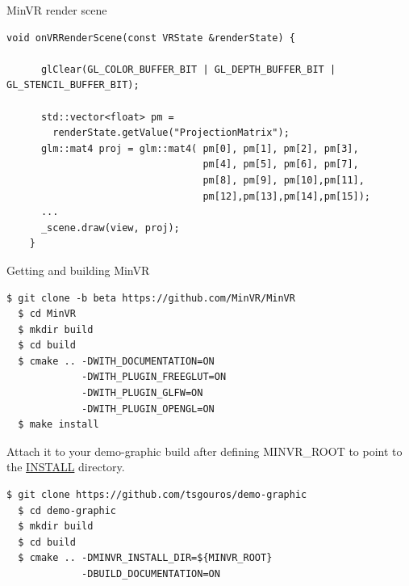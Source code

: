 \documentclass[12pt]{article}
\begin{document}
\begin{frame}[fragile]{MinVR render scene}

\begin{Verbatim}[fontsize=\small]
  void onVRRenderScene(const VRState &renderState) {

      glClear(GL_COLOR_BUFFER_BIT | GL_DEPTH_BUFFER_BIT | GL_STENCIL_BUFFER_BIT);

      std::vector<float> pm =
        renderState.getValue("ProjectionMatrix");
      glm::mat4 proj = glm::mat4( pm[0], pm[1], pm[2], pm[3],
                                  pm[4], pm[5], pm[6], pm[7],
                                  pm[8], pm[9], pm[10],pm[11],
                                  pm[12],pm[13],pm[14],pm[15]);
      ...
      _scene.draw(view, proj);
    }
  \end{Verbatim}
\end{frame}

\begin{frame}[fragile]{Getting and building MinVR}

\begin{Verbatim}[fontsize=\small]
  $ git clone -b beta https://github.com/MinVR/MinVR
  $ cd MinVR
  $ mkdir build
  $ cd build
  $ cmake .. -DWITH_DOCUMENTATION=ON
             -DWITH_PLUGIN_FREEGLUT=ON
             -DWITH_PLUGIN_GLFW=ON
             -DWITH_PLUGIN_OPENGL=ON
  $ make install
\end{Verbatim}

Attach it to your demo-graphic build after defining MINVR\_ROOT to
point to the \underline{INSTALL} directory.

\begin{Verbatim}[fontsize=\small]
  $ git clone https://github.com/tsgouros/demo-graphic
  $ cd demo-graphic
  $ mkdir build
  $ cd build
  $ cmake .. -DMINVR_INSTALL_DIR=${MINVR_ROOT}
             -DBUILD_DOCUMENTATION=ON
\end{Verbatim}
\end{frame}
\end{document}
